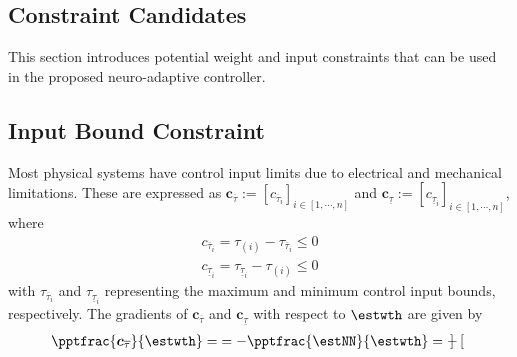 \documentclass[lettersize,journal]{IEEEtran}
\begin{document}
\begin{appendices}

\section{Constraint Candidates}\label{sec:appen:cstr} 

This section introduces potential weight and input constraints that can be used in the proposed neuro-adaptive controller. 

\subsection{Input Bound Constraint}\label{sec:appen:input_bound_cstr}

Most physical systems have control input limits due to electrical and mechanical limitations. These are expressed as $\boldsymbol{c}_{\overline \tau}:= [c_{\overline \tau_i}]_{i\in[1,\cdots,n]}$ and $\boldsymbol{c}_{\underline\tau}:= [c_{\underline\tau_i}]_{i\in[1,\cdots,n]}$, where
\begin{equation}
    \begin{aligned}
        c_{\overline \tau_i}=\tau_{(i)} - {\tau_{\overline \tau_i}} \le 0
        \\
        c_{\underline\tau_i}={\tau_{\underline\tau_i}}-\tau_{(i)} \le 0
    \end{aligned}
    \label{eq. cstr input saturation}
\end{equation}
with $\tau_{\overline \tau_i}$ and $\tau_{\underline\tau_i}$ representing the maximum and minimum control input bounds, respectively.
The gradients of $\boldsymbol{c}_{\overline \tau}$ and $\boldsymbol{c}_{\underline\tau}$ with respect to $\estwth$ are given by
\begin{equation}
    \begin{aligned}
        \pptfrac{\boldsymbol c_{\overline \tau}}{\estwth}
        =& 
        = 
            -\pptfrac{\estNN}{\estwth}
        =
        -\begin{bmatrix}

\end{bmatrix}
\end{aligned}
\end{equation}
\end{appendices}
\end{document}
